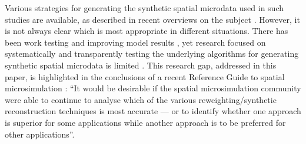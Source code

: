 \documentclass[a4paper,10pt]{article}
\begin{document}
Various strategies for generating the synthetic spatial microdata used
in such studies are available,
as described in recent overviews on the subject
\citep{Tanton2013, Ballas2013-4policy-analysis, Hermes2012a}.
However, it is not always clear which is most appropriate in different situations.
There has been work testing %
and improving model results \citep{teh2003improving}, yet research focused on
systematically and transparently testing
the underlying algorithms for generating synthetic spatial microdata is
limited \citep{harland2012}.
This research gap, addressed in this paper, is highlighted 
in the conclusions of a recent Reference Guide to spatial microsimulation
\citep[p~270]{Clarke2013-concs}:
``It would be desirable if the spatial microsimulation community were able to continue to
analyse which of the various reweighting/synthetic reconstruction techniques is most accurate
--- or to identify whether one approach is superior for some applications while another
approach is to be preferred for other applications''.



% 
\end{document}
